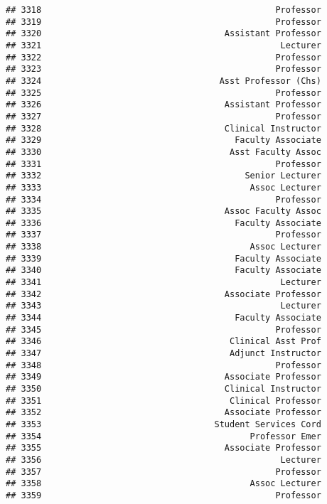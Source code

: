 \documentclass[
]{article}
\begin{document}
\begin{verbatim}
## 3318                                              Professor
## 3319                                              Professor
## 3320                                    Assistant Professor
## 3321                                               Lecturer
## 3322                                              Professor
## 3323                                              Professor
## 3324                                   Asst Professor (Chs)
## 3325                                              Professor
## 3326                                    Assistant Professor
## 3327                                              Professor
## 3328                                    Clinical Instructor
## 3329                                      Faculty Associate
## 3330                                     Asst Faculty Assoc
## 3331                                              Professor
## 3332                                        Senior Lecturer
## 3333                                         Assoc Lecturer
## 3334                                              Professor
## 3335                                    Assoc Faculty Assoc
## 3336                                      Faculty Associate
## 3337                                              Professor
## 3338                                         Assoc Lecturer
## 3339                                      Faculty Associate
## 3340                                      Faculty Associate
## 3341                                               Lecturer
## 3342                                    Associate Professor
## 3343                                               Lecturer
## 3344                                      Faculty Associate
## 3345                                              Professor
## 3346                                     Clinical Asst Prof
## 3347                                     Adjunct Instructor
## 3348                                              Professor
## 3349                                    Associate Professor
## 3350                                    Clinical Instructor
## 3351                                     Clinical Professor
## 3352                                    Associate Professor
## 3353                                  Student Services Cord
## 3354                                         Professor Emer
## 3355                                    Associate Professor
## 3356                                               Lecturer
## 3357                                              Professor
## 3358                                         Assoc Lecturer
## 3359                                              Professor

\end{verbatim}
\end{document}
